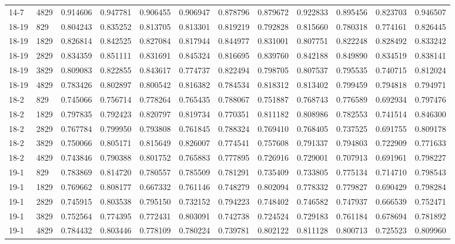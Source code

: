 \begin{longtable}{llrrrrrrrrrr}
14-7 & 4829 & 0.914606 & 0.947781 & 0.906455 & 0.906947 & 0.878796 & 0.879672 & 0.922833 & 0.895456 & 0.823703 & 0.946507\\
18-19 & 829 & 0.804243 & 0.835252 & 0.813705 & 0.813301 & 0.819219 & 0.792828 & 0.815660 & 0.780318 & 0.774161 & 0.826445\\
18-19 & 1829 & 0.826814 & 0.842525 & 0.827084 & 0.817944 & 0.844977 & 0.831001 & 0.807751 & 0.822248 & 0.828492 & 0.833242\\
18-19 & 2829 & 0.834359 & 0.851111 & 0.831691 & 0.845324 & 0.816695 & 0.839760 & 0.842188 & 0.849890 & 0.834519 & 0.838141\\
18-19 & 3829 & 0.809083 & 0.822855 & 0.843617 & 0.774737 & 0.822494 & 0.798705 & 0.807537 & 0.795535 & 0.740715 & 0.812024\\
18-19 & 4829 & 0.783426 & 0.802897 & 0.800542 & 0.816382 & 0.784534 & 0.818312 & 0.813402 & 0.799459 & 0.794818 & 0.794971\\
18-2 & 829 & 0.745066 & 0.756714 & 0.778264 & 0.765435 & 0.788067 & 0.751887 & 0.768743 & 0.776589 & 0.692934 & 0.797476\\
18-2 & 1829 & 0.797835 & 0.792423 & 0.820797 & 0.819734 & 0.770351 & 0.811182 & 0.808986 & 0.782553 & 0.741514 & 0.846300\\
18-2 & 2829 & 0.767784 & 0.799950 & 0.793808 & 0.761845 & 0.788324 & 0.769410 & 0.768405 & 0.737525 & 0.691755 & 0.809178\\
18-2 & 3829 & 0.750066 & 0.805171 & 0.815649 & 0.826007 & 0.774541 & 0.757608 & 0.791337 & 0.794803 & 0.722909 & 0.771633\\
18-2 & 4829 & 0.743846 & 0.790388 & 0.801752 & 0.765883 & 0.777895 & 0.726916 & 0.729001 & 0.707913 & 0.691961 & 0.798227\\
19-1 & 829 & 0.783869 & 0.814720 & 0.780557 & 0.785509 & 0.781291 & 0.735409 & 0.733805 & 0.775134 & 0.714710 & 0.798543\\
19-1 & 1829 & 0.769662 & 0.808177 & 0.667332 & 0.761146 & 0.748279 & 0.802094 & 0.778332 & 0.779827 & 0.690429 & 0.798284\\
19-1 & 2829 & 0.745915 & 0.803538 & 0.795150 & 0.732152 & 0.794223 & 0.748402 & 0.746582 & 0.747937 & 0.666539 & 0.752471\\
19-1 & 3829 & 0.752564 & 0.774395 & 0.772431 & 0.803091 & 0.742738 & 0.724524 & 0.729183 & 0.761184 & 0.678694 & 0.781892\\
19-1 & 4829 & 0.784432 & 0.803446 & 0.778109 & 0.780224 & 0.739781 & 0.802122 & 0.811128 & 0.800713 & 0.725523 & 0.809960\\

\end{longtable}
